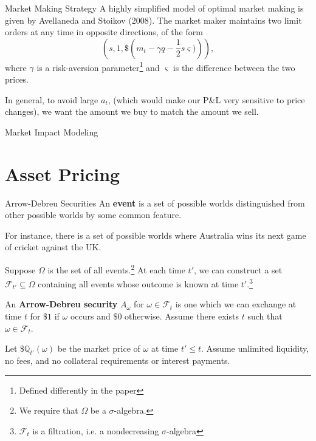 \documentclass{beamer}
\begin{document}
\begin{frame}{Market Making Strategy}
	A highly simplified model of optimal market making is given by Avellaneda and Stoikov (2008). The market maker maintains two limit orders at any time in opposite directions, of the form
	$$\left(s, 1, \$\left(m_t - \gamma q - \frac{1}{2}s\varsigma)\right)\right),$$
	where $\gamma$ is a risk-aversion parameter\footnote{Defined differently in the paper} and $\varsigma$ is the difference between the two prices.

	In general, to avoid large $a_t$, (which would make our P\&L very sensitive to price changes), we want the amount we buy to match the amount we sell. %
\end{frame}

\begin{frame}{Market Impact Modeling}

\end{frame}

\section{Asset Pricing}
\begin{frame}{Arrow-Debreu Securities}
	An \textbf{event} is a set of possible worlds distinguished from other possible worlds by some common feature.

	For instance, there is a set of possible worlds where Australia wins its next game of cricket against the UK.%

	Suppose $\Omega$ is the set of all events.\footnote{We require that $\Omega$ be a $\sigma$-algebra.} At each time $t'$, we can construct a set $\mathcal{F}_{t'}\subseteq \Omega$ containing all events whose outcome is known at time $t'$.\footnote{$\mathcal{F}_t$ is a filtration, i.e. a nondecreasing $\sigma$-algebra}

	An \textbf{Arrow-Debreu security} $A_\omega$ for $\omega\in \mathcal{F}_t$ is one which we can exchange at time $t$ for $\$1$ if $\omega$ occurs and $\$0$ otherwise. Assume there exists $t$ such that $\omega\in\mathcal{F}_t$.

	Let $\$\mathbb{Q}_{t'}(\omega)$ be the market price of $\omega$ at time $t'\leq t$. Assume unlimited liquidity, no fees, and no collateral requirements or interest payments.
\end{frame}
\end{document}
